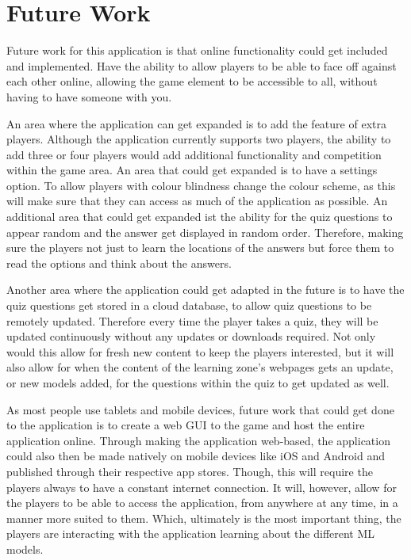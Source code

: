 	\section{Future Work}
		Future work for this application is that online functionality could get included and implemented. Have the ability to allow players to be able to face off against each other online, allowing the game element to be accessible to all, without having to have someone with you.
		
		An area where the application can get expanded is to add the feature of extra players. Although the application currently supports two players, the ability to add three or four players would add additional functionality and competition within the game area. An area that could get expanded is to have a settings option. To allow players with colour blindness change the colour scheme, as this will make sure that they can access as much of the application as possible. An additional area that could get expanded ist the ability for the quiz questions to appear random and the answer get displayed in random order. Therefore, making sure the players not just to learn the locations of the answers but force them to read the options and think about the answers.
		
		Another area where the application could get adapted in the future is to have the quiz questions get stored in a cloud database, to allow quiz questions to be remotely updated. Therefore every time the player takes a quiz, they will be updated continuously without any updates or downloads required. Not only would this allow for fresh new content to keep the players interested, but it will also allow for when the content of the learning zone's webpages gets an update, or new models added, for the questions within the quiz to get updated as well.
		
		As most people use tablets and mobile devices, future work that could get done to the application is to create a web GUI to the game and host the entire application online. Through making the application web-based, the application could also then be made natively on mobile devices like iOS and Android and published through their respective app stores. Though, this will require the players always to have a constant internet connection. It will, however, allow for the players to be able to access the application, from anywhere at any time, in a manner more suited to them. Which, ultimately is the most important thing, the players are interacting with the application learning about the different ML models.
		

